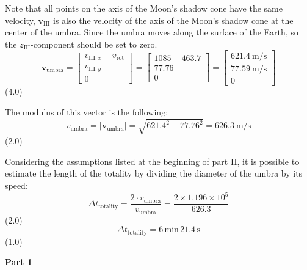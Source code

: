 \begin{description}
  Note that all points on the axis of the Moon's shadow cone have the same
  velocity, $\mathbf{v}_{\mathrm{III}}$ is also the velocity of the axis of
  the Moon's shadow cone at the center of the umbra. Since the umbra moves
  along the surface of the Earth, so the $z_{\mathrm{III}}$-component should
  be set to zero.
  \[
    \mathbf{v}_{\mathrm{umbra}} =
    \begin{bmatrix}
      v_{\mathrm{III},x} - v_{\mathrm{rot}}\\
      v_{\mathrm{III},y}\\
      0
    \end{bmatrix}
    =
    \begin{bmatrix}
      1085 - 463.7\\
      77.76\\
      0
    \end{bmatrix}
    =
    \begin{bmatrix}
      621.4\ \mathrm{m/s}\\
      77.59\ \mathrm{m/s}\\ %
      0
    \end{bmatrix}
  \]
  \hfill(4.0)

  The modulus of this vector is the following:
  \[
    v_{\mathrm{umbra}} = |\mathbf{v}_{\mathrm{umbra}}|
      = \sqrt{621.4^2 + 77.76^2} = 626.3\ \mathrm{m/s}
  \]
  \hfill(2.0)

\item[(k)] Considering the assumptions listed at the beginning of part II, it
  is possible to estimate the length of the totality by dividing the diameter
  of the umbra by its speed:
  \[
    \Delta t_{\mathrm{totality}}
      = \frac{2 \cdot r_{\mathrm{umbra}}}{v_{\mathrm{umbra}}}
      = \frac{2 \times 1.196 \times 10^{5}}{626.3}
  \]
  \hfill(2.0)
  \[
    \boxed{\Delta t_{\mathrm{totality}} = 6\,\mathrm{min}\,21.4\,\mathrm{s}}
  \]
  \hfill(1.0)
\end{description}

\medskip\noindent\textbf{Part 1}


